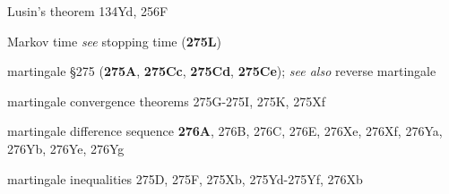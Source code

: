 



Lusin's theorem 134Yd, 256F
  





\indexmedskip
































































Markov time {\it see} stopping time ({\bf 275L}) 













martingale \S275 ({\bf 275A}, {\bf 275Cc}, {\bf 275Cd}, {\bf
275Ce});
  {\it see also} reverse martingale


martingale convergence theorems 275G-275I, 
275K, 275Xf


martingale difference sequence {\bf 276A}, 276B, 276C, 276E, 276Xe,
276Xf, 276Ya, 276Yb, 276Ye, 276Yg


martingale inequalities 275D, 275F, 275Xb,
275Yd-275Yf, 
276Xb





